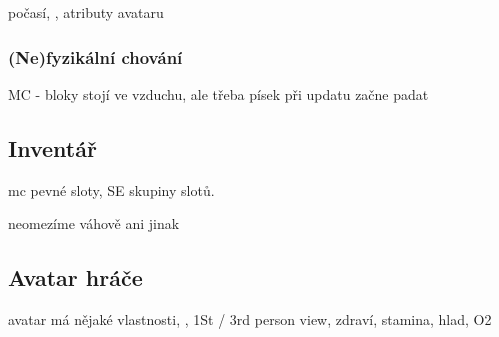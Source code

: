 počasí, \NPC{}, atributy avataru

\subsubsection{(Ne)fyzikální chování}

MC - bloky stojí ve vzduchu, ale třeba písek při updatu začne padat

\subsection{Inventář}

mc pevné sloty, SE skupiny slotů.

neomezíme váhově ani jinak 

\subsection{Avatar hráče}
avatar má nějaké vlastnosti, \HUD{}, 1St / 3rd person view, zdraví, stamina, hlad, O2



